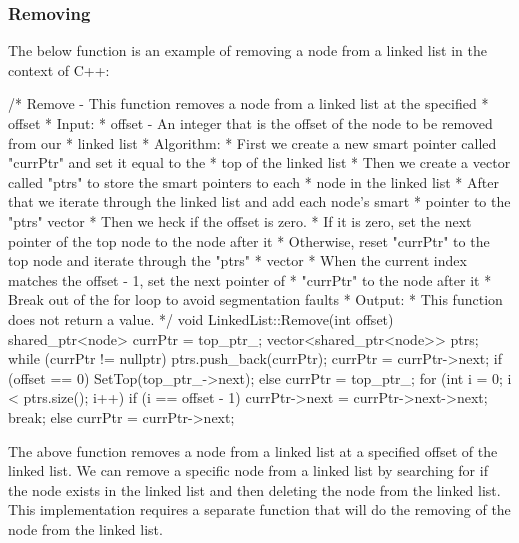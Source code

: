 \begin{highlight}

\subsubsection*{Removing}

The below function is an example of removing a node from a linked list in the context of C++:

\begin{code}
/*  Remove - This function removes a node from a linked list at the specified 
*            offset
*   Input:
*     offset - An integer that is the offset of the node to be removed from our 
*              linked list
*   Algorithm:
*     First we create a new smart pointer called "currPtr" and set it equal to the 
*     top of the linked list
*     Then we create a vector called "ptrs" to store the smart pointers to each 
*     node in the linked list
*     After that we iterate through the linked list and add each node's smart 
*     pointer to the "ptrs" vector
*     Then we heck if the offset is zero.
*       If it is zero, set the next pointer of the top node to the node after it
*     Otherwise, reset "currPtr" to the top node and iterate through the "ptrs" 
*     vector
*       When the current index matches the offset - 1, set the next pointer of 
*       "currPtr" to the node after it
*       Break out of the for loop to avoid segmentation faults
*     Output:
*       This function does not return a value.
*/
void LinkedList::Remove(int offset){
    shared_ptr<node> currPtr = top_ptr_;
    vector<shared_ptr<node>> ptrs;
    while (currPtr != nullptr) {
        ptrs.push_back(currPtr);
        currPtr = currPtr->next;
    }
    if (offset == 0) {
        SetTop(top_ptr_->next);
    }
    else {
        currPtr = top_ptr_;
        for (int i = 0; i < ptrs.size(); i++) {
            if (i == offset - 1) {
                currPtr->next = currPtr->next->next;
                break;
            }
            else {}
                currPtr = currPtr->next;
        }
    }
}
\end{code}

The above function removes a node from a linked list at a specified offset of the linked list. We can remove a specific node from a linked list by searching for if the node exists in the linked list
and then deleting the node from the linked list. This implementation requires a separate function that will do the removing of the node from the linked list.

\end{highlight}

